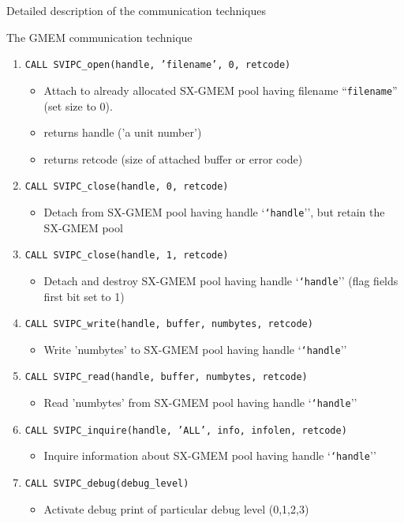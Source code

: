 \begin{section}{Detailed description of the communication techniques}
\begin{subsection}{The GMEM communication technique}
\begin{enumerate}
\item {\tt CALL SVIPC\_open(handle, 'filename', 0, retcode)}
 \begin{itemize}
     \item Attach to already allocated SX-GMEM pool having filename ``{\tt filename}'' (set size to 0).
     \item returns handle ('a unit number')
     \item returns retcode (size of attached buffer or error code)
 \end{itemize}

\item {\tt CALL SVIPC\_close(handle, 0, retcode)}
 \begin{itemize}
     \item Detach from SX-GMEM pool having handle `{\tt `handle}'', but retain the SX-GMEM pool
 \end{itemize}

\item {\tt CALL SVIPC\_close(handle, 1, retcode)}
 \begin{itemize}
     \item Detach and destroy SX-GMEM pool having handle `{\tt `handle}'' (flag fields first bit set to 1)
 \end{itemize}

\item {\tt CALL SVIPC\_write(handle, buffer, numbytes, retcode)}
 \begin{itemize}
     \item Write 'numbytes' to SX-GMEM pool having handle `{\tt `handle}''
 \end{itemize}

\item {\tt CALL SVIPC\_read(handle, buffer, numbytes, retcode)}
 \begin{itemize}
     \item Read 'numbytes' from SX-GMEM pool having handle `{\tt `handle}''
 \end{itemize}

\item {\tt CALL SVIPC\_inquire(handle, 'ALL', info, infolen, retcode)}
 \begin{itemize}
     \item Inquire information about SX-GMEM pool having handle `{\tt `handle}''
 \end{itemize}

\item {\tt CALL SVIPC\_debug(debug\_level)}
 \begin{itemize}
     \item Activate debug print of particular debug level (0,1,2,3)
 \end{itemize}


\end{enumerate}
\end{subsection}
\end{section}
